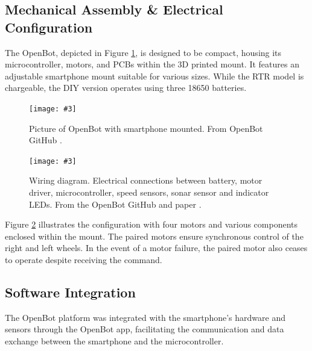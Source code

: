 \documentclass[12pt]{report}
\newcommand\insertfigure[5]{
\begin{figure}[#1]
\begin{center}
\texttt{[image: \#3]}
\end{center}
\caption{#4}
\label{#5}
\end{figure}
}
\begin{document}
\subsection{Mechanical Assembly \& Electrical Configuration}
\label{sub:Mechanical_assembly}



The OpenBot, depicted in Figure \ref{fig:RTR_TT}, is designed to be compact, housing its microcontroller, motors, and PCBs within the 3D printed mount. It features an adjustable smartphone mount suitable for various sizes. While the RTR model is chargeable, the DIY version operates using three 18650 batteries.


\insertfigure{th}{0.35\textwidth}{RTR_TT.jpg}{Picture of OpenBot with smartphone mounted. From OpenBot GitHub \cite{bib:git_openbot}.}{fig:RTR_TT}

\insertfigure{th}{0.7\textwidth}{wiring_diagram.png}{Wiring diagram. Electrical connections between battery, motor driver, microcontroller, speed sensors, sonar sensor and indicator LEDs. From the OpenBot GitHub and paper \cite{bib:openbot}\cite{bib:git_openbot}.}{fig:wiring_diagram}

Figure \ref{fig:wiring_diagram} illustrates the configuration with four motors and various components enclosed within the mount. The paired motors ensure synchronous control of the right and left wheels. In the event of a motor failure, the paired motor also ceases to operate despite receiving the command.




\subsection{Software Integration}
\label{sub:Software_integration}

The OpenBot platform was integrated with the smartphone's hardware and sensors through the OpenBot app, facilitating the communication and data exchange between the smartphone and the microcontroller.
\end{document}
